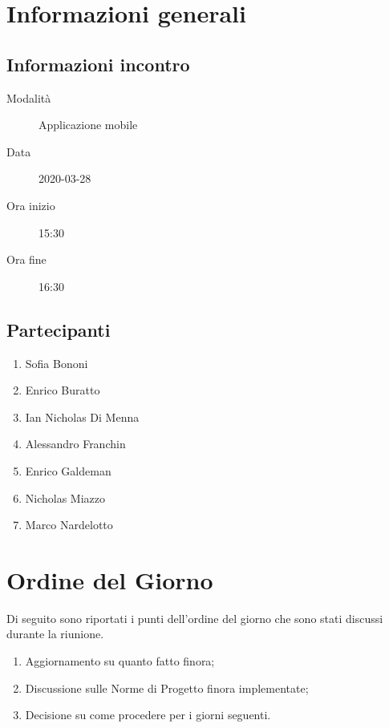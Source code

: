 \documentclass{article}
\begin{document}


\section{Informazioni generali}%
\label{sec:informazioni_generali}

\subsection{Informazioni incontro}%
\label{sub:informazioni_incontro}

\begin{description}
  \item[Modalità] Applicazione mobile 
  \item[Data] 2020-03-28
  \item[Ora inizio] 15:30
  \item[Ora fine] 16:30
\end{description}

\subsection{Partecipanti}%
\label{sub:partecipanti}

\begin{enumerate}
  \item Sofia Bononi
  \item Enrico Buratto
  \item Ian Nicholas Di Menna
  \item Alessandro Franchin
  \item Enrico Galdeman
  \item Nicholas Miazzo
  \item Marco Nardelotto
\end{enumerate}

\section{Ordine del Giorno}%
\label{ordine_del_giorno}
Di seguito sono riportati i punti dell'ordine del giorno che sono stati discussi durante la riunione.
\begin{enumerate}
  \item Aggiornamento su quanto fatto finora;
  \item Discussione sulle Norme di Progetto finora implementate;
  \item Decisione su come procedere per i giorni seguenti.
\end{enumerate}
\end{document}
